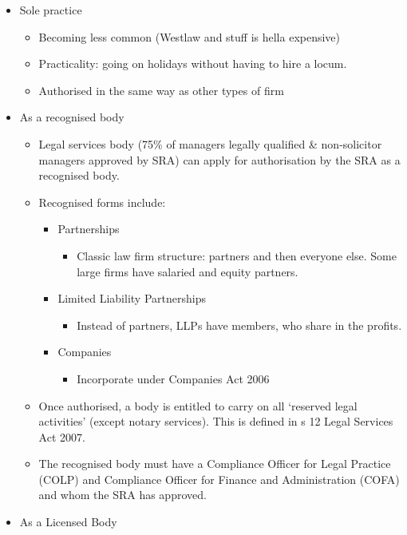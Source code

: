 \documentclass[
]{article}
\providecommand{\tightlist}{%
  \setlength{\itemsep}{0pt}\setlength{\parskip}{0pt}}
\begin{document}
\begin{itemize}
\tightlist
\item
  Sole practice

  \begin{itemize}
  \tightlist
  \item
    Becoming less common (Westlaw and stuff is hella expensive)
  \item
    Practicality: going on holidays without having to hire a locum.
  \item
    Authorised in the same way as other types of firm
  \end{itemize}
\item
  As a recognised body

  \begin{itemize}
  \tightlist
  \item
    Legal services body (75\% of managers legally qualified \&
    non-solicitor managers approved by SRA) can apply for authorisation
    by the SRA as a recognised body.
  \item
    Recognised forms include:

    \begin{itemize}
    \tightlist
    \item
      Partnerships

      \begin{itemize}
      \tightlist
      \item
        Classic law firm structure: partners and then everyone else.
        Some large firms have salaried and equity partners.
      \end{itemize}
    \item
      Limited Liability Partnerships

      \begin{itemize}
      \tightlist
      \item
        Instead of partners, LLPs have members, who share in the
        profits.
      \end{itemize}
    \item
      Companies

      \begin{itemize}
      \tightlist
      \item
        Incorporate under Companies Act 2006
      \end{itemize}
    \end{itemize}
  \item
    Once authorised, a body is entitled to carry on all `reserved legal
    activities' (except notary services). This is defined in s 12 Legal
    Services Act 2007.
  \item
    The recognised body must have a Compliance Officer for Legal
    Practice (COLP) and Compliance Officer for Finance and
    Administration (COFA) and whom the SRA has approved.
  \end{itemize}
\item
  As a Licensed Body


\end{itemize}
\end{document}
